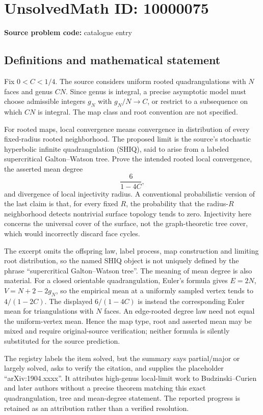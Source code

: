 \documentclass[11pt]{article}
\begin{document}
\section*{UnsolvedMath ID: 10000075}
\textbf{Source problem code:} catalogue entry
\subsection{Definitions and mathematical statement}
Fix \(0<C<1/4\). The source considers uniform rooted quadrangulations with \(N\) faces and genus \(CN\). Since genus is integral, a precise asymptotic model must choose admissible integers \(g_N\) with \(g_N/N\to C\), or restrict to a subsequence on which \(CN\) is integral. The map class and root convention are not specified.

For rooted maps, local convergence means convergence in distribution of every fixed-radius rooted neighborhood. The proposed limit is the source's stochastic hyperbolic infinite quadrangulation (SHIQ), said to arise from a labeled supercritical Galton--Watson tree. Prove the intended rooted local convergence, the asserted mean degree
\[
 \frac{6}{1-4C},
\]
and divergence of local injectivity radius. A conventional probabilistic version of the last claim is that, for every fixed \(R\), the probability that the radius-\(R\) neighborhood detects nontrivial surface topology tends to zero. Injectivity here concerns the universal cover of the surface, not the graph-theoretic tree cover, which would incorrectly discard face cycles.

The excerpt omits the offspring law, label process, map construction and limiting root distribution, so the named SHIQ object is not uniquely defined by the phrase ``supercritical Galton--Watson tree''. The meaning of mean degree is also material. For a closed orientable quadrangulation, Euler's formula gives \(E=2N\), \(V=N+2-2g_N\), so the empirical mean at a uniformly sampled vertex tends to \(4/(1-2C)\). The displayed \(6/(1-4C)\) is instead the corresponding Euler mean for triangulations with \(N\) faces. An edge-rooted degree law need not equal the uniform-vertex mean. Hence the map type, root and asserted mean may be mixed and require original-source verification; neither formula is silently substituted for the source prediction.

The registry labels the item solved, but the summary says partial/major or largely solved, asks to verify the citation, and supplies the placeholder ``arXiv:1904.xxxx''. It attributes high-genus local-limit work to Budzinski--Curien and later authors without a precise theorem matching this exact quadrangulation, tree and mean-degree statement. The reported progress is retained as an attribution rather than a verified resolution.
\end{document}
